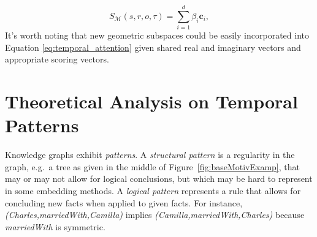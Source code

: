 \documentclass[letterpaper]{article} %
\begin{document}


\begin{equation}
S_{\mathcal{M}}(s,r,o, \tau) = \sum_{i=1}^{d}\beta_i \boldsymbol{c}_i,
    \label{eq:temporal_attention}
\end{equation}
It's worth noting that new geometric subspaces could be easily incorporated into Equation \ref{eq:temporal_attention} given shared real and imaginary vectors and appropriate scoring vectors.


\section{Theoretical Analysis on Temporal Patterns}
\label{sec:temporal_patterns}
Knowledge graphs exhibit \emph{patterns}. 
A \emph{structural pattern} is a regularity in the graph, e.g.\ a tree as given in the middle of Figure~\ref{fig:baseMotivExamp}, that may or may not allow for logical conclusions, but which may be hard to represent in some embedding methods. 
A \emph{logical pattern} represents a rule that allows for concluding new facts when applied to given facts. For instance, \textit{(Charles,marriedWith,Camilla)} implies
 \textit{(Camilla,marriedWith,Charles)} because \textit{marriedWith} is symmetric. 
\end{document}
